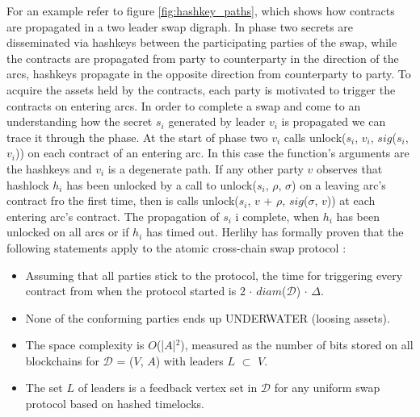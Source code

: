 For an example refer to figure \ref{fig:hashkey_paths}, which shows how contracts are propagated in a two leader swap digraph. \newline \newline
In phase two secrets are disseminated via hashkeys between the participating parties of the swap, while the contracts are propagated from party to counterparty in the direction of the arcs, hashkeys propagate in the opposite direction from counterparty to party. To acquire the assets held by the contracts, each party is motivated to trigger the contracts on entering arcs. In order to complete a swap and come to an understanding how the secret $s_i$ generated by leader $v_i$ is propagated we can trace it through the phase. At the start of phase two $v_i$ calls unlock($s_i$, $v_i$, $sig$($s_i$, $v_i$)) on each contract of an entering arc. In this case the function's arguments are the hashkeys and $v_i$ is a degenerate path. If any other party $v$ observes that hashlock $h_i$ has been unlocked by a call to unlock($s_i$, $\rho$, $\sigma$) on a leaving arc's contract fro the first time, then is calls unlock($s_i$, $v$ + $\rho$, $sig$($\sigma$, $v$)) at each entering arc's contract. The propagation of $s_i$ i complete, when $h_i$ has been unlocked on all arcs or if $h_i$ has timed out. Herlihy has formally proven that the following statements apply to the atomic cross-chain swap protocol \cite{herlihy2018atomic}:

\begin{itemize}
	\item Assuming that all parties stick to the protocol, the time for triggering every contract from when the protocol started is 2 $\cdot$ $diam$($\mathcal{D}$) $\cdot$ $\Delta$.
	\item None of the conforming parties ends up UNDERWATER (loosing assets).
	\item The space complexity is $O$(|$A$|$^{2}$), measured as the number of bits stored on all blockchains for $\mathcal{D}$ = ($V$, $A$) with leaders $L$ $\subset$ $V$.
	\item The set $L$ of leaders is a feedback vertex set in $\mathcal{D}$ for any uniform swap protocol based on hashed timelocks.
\end{itemize}

